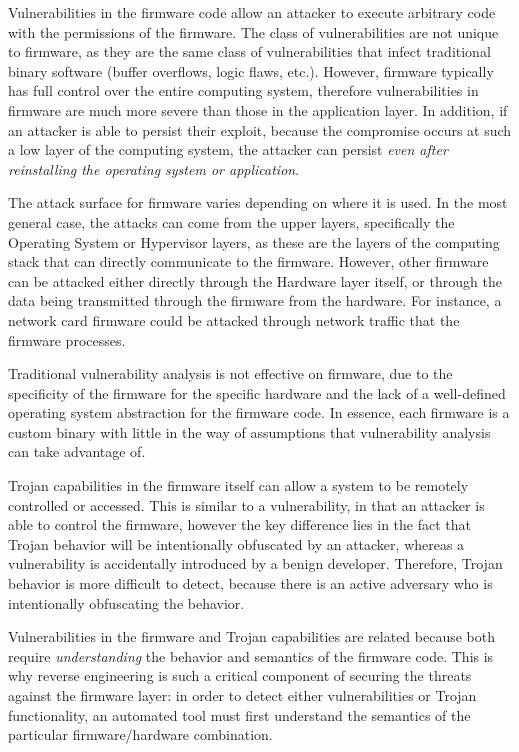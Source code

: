\documentclass[11pt,letterpaper]{article}
\begin{document}
Vulnerabilities in the firmware code allow an attacker to execute
arbitrary code with the permissions of the firmware. The class of
vulnerabilities are not unique to firmware, as they are the same class
of vulnerabilities that infect traditional binary software (buffer
overflows, logic flaws, etc.). However, firmware typically has full
control over the entire computing system, therefore vulnerabilities in
firmware are much more severe than those in the application layer. In
addition, if an attacker is able to persist their exploit, because the
compromise occurs at such a low layer of the computing system, the
attacker can persist \emph{even after reinstalling the operating
  system or application}.

The attack surface for firmware varies depending on where it is used.
In the most general case, the attacks can come from the upper layers,
specifically the Operating System or Hypervisor layers, as these are
the layers of the computing stack that can directly communicate to the
firmware. However, other firmware can be attacked either directly
through the Hardware layer itself, or through the data being
transmitted through the firmware from the hardware. For instance, a
network card firmware could be attacked through network traffic that
the firmware processes.

Traditional vulnerability analysis is not effective on firmware, due
to the specificity of the firmware for the specific hardware and the
lack of a well-defined operating system abstraction for the firmware
code. In essence, each firmware is a custom binary with little in the
way of assumptions that vulnerability analysis can take advantage of. 

Trojan capabilities in the firmware itself can allow a system to be
remotely controlled or accessed. This is similar to a vulnerability,
in that an attacker is able to control the firmware, however the key
difference lies in the fact that Trojan behavior will be intentionally
obfuscated by an attacker, whereas a vulnerability is accidentally
introduced by a benign developer. Therefore, Trojan behavior is 
more difficult to detect, because there is an active adversary who is
intentionally obfuscating the behavior. 

Vulnerabilities in the firmware and Trojan capabilities are related
because both require \emph{understanding} the behavior and semantics
of the firmware code. This is why reverse engineering is such a
critical component of securing the threats against the firmware layer:
in order to detect either vulnerabilities or Trojan functionality, an
automated tool must first understand the semantics of the particular
firmware/hardware combination. 
\end{document}
